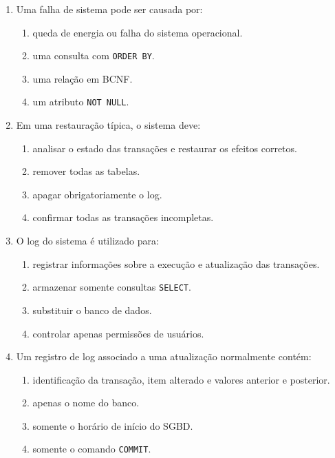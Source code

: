 \documentclass[12pt,a4paper]{article}
\begin{document}
\begin{enumerate}[label=\textbf{Q\arabic*.}]
\item Uma falha de sistema pode ser causada por:

\begin{enumerate}[label=\alph*)]
    \item queda de energia ou falha do sistema operacional.
    \item uma consulta com \texttt{ORDER BY}.
    \item uma relação em BCNF.
    \item um atributo \texttt{NOT NULL}.
\end{enumerate}

\item Em uma restauração típica, o sistema deve:

\begin{enumerate}[label=\alph*)]
    \item analisar o estado das transações e restaurar os efeitos corretos.
    \item remover todas as tabelas.
    \item apagar obrigatoriamente o log.
    \item confirmar todas as transações incompletas.
\end{enumerate}

\item O log do sistema é utilizado para:

\begin{enumerate}[label=\alph*)]
    \item registrar informações sobre a execução e atualização das transações.
    \item armazenar somente consultas \texttt{SELECT}.
    \item substituir o banco de dados.
    \item controlar apenas permissões de usuários.
\end{enumerate}

\item Um registro de log associado a uma atualização normalmente contém:

\begin{enumerate}[label=\alph*)]
    \item identificação da transação, item alterado e valores anterior e posterior.
    \item apenas o nome do banco.
    \item somente o horário de início do SGBD.
    \item somente o comando \texttt{COMMIT}.
\end{enumerate}


\end{enumerate}
\end{document}
